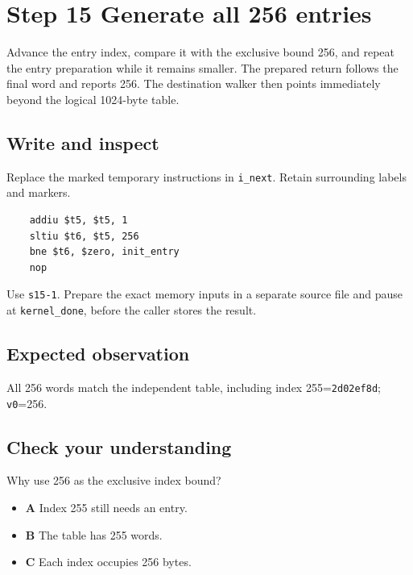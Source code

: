 \section{Step 15 Generate all 256 entries}\label{crc-s15}

Advance the entry index, compare it with the exclusive bound 256, and repeat the entry preparation while it remains smaller. The prepared return follows the final word and reports 256. The destination walker then points immediately beyond the logical 1024-byte table.

\subsection{Write and inspect}
Replace the marked temporary instructions in \texttt{i\_next}. Retain surrounding labels and markers.

\begin{verbatim}
    addiu $t5, $t5, 1
    sltiu $t6, $t5, 256
    bne $t6, $zero, init_entry
    nop
\end{verbatim}

Use \texttt{s15-1}. Prepare the exact memory inputs in a separate source file and pause at \texttt{kernel\_done}, before the caller stores the result.

\subsection{Expected observation}
All 256 words match the independent table, including index 255=\texttt{2d02ef8d}; \texttt{v0}=256.

\subsection{Check your understanding}
Why use 256 as the exclusive index bound?

\begin{itemize}
\item \textbf{A} Index 255 still needs an entry.
\item \textbf{B} The table has 255 words.
\item \textbf{C} Each index occupies 256 bytes.
\end{itemize}
